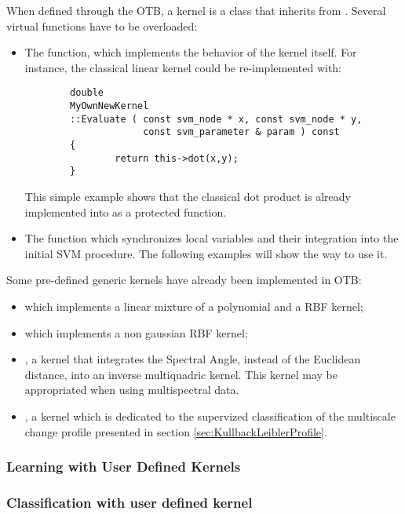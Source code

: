 When defined through the OTB, a kernel is a class that inherits from
. Several virtual functions have to 
be overloaded:
\begin{itemize}
\item The  function, which implements the behavior of the 
kernel
itself. For instance, the classical linear kernel could be re-implemented
with:
\begin{verbatim}
        double
        MyOwnNewKernel
        ::Evaluate ( const svm_node * x, const svm_node * y,
                     const svm_parameter & param ) const
        {
                return this->dot(x,y);
        }
\end{verbatim}
This simple example shows that the classical dot product is already 
implemented
into  as a protected
function.
\item The  function which synchronizes local variables and 
their
integration into the initial SVM procedure. The following examples will show
the way to use it.
\end{itemize}

Some pre-defined generic kernels have already been implemented in OTB:
\begin{itemize}
\item {} which implements a 
linear mixture
of a polynomial and a RBF kernel;
\item {} which implements a non
gaussian RBF kernel;
\item {}, a kernel that integrates
the Spectral Angle, instead of the Euclidean distance, into an inverse 
multiquadric kernel.
This kernel may be appropriated when using multispectral data.
\item {}, a kernel which is
dedicated to the supervized classification of the multiscale change profile
presented in section \ref{sec:KullbackLeiblerProfile}.
\end{itemize}

\subsubsection{Learning with User Defined Kernels}
\label{sec:Learningwithuserdefinedkernel}
\ifitkFullVersion

\fi

\subsubsection{Classification with user defined kernel}

